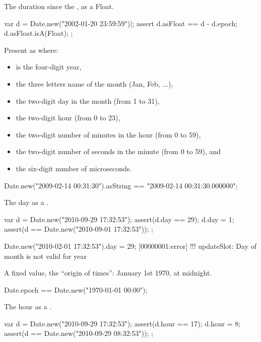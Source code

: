 \begin{urbiscriptapi}
\item[asFloat] The duration since the , as a Float.
\begin{urbiscript}
var d = Date.new("2002-01-20 23:59:59")|;
assert
{
  d.asFloat == d - d.epoch;
  d.asFloat.isA(Float);
};
\end{urbiscript}

\item[asString] Present as  where:
  \begin{itemize}
  \item {} is the four-digit year,
  \item {} the three letters name of the month (Jan, Feb, ...),
  \item {} the two-digit day in the month (from 1 to 31),
  \item {} the two-digit hour (from 0 to 23),
  \item {} the two-digit number of minutes in the hour (from 0 to 59),
  \item {} the two-digit number of seconds in the minute (from 0 to
    59), and
  \item {} the six-digit number of microseconds.
  \end{itemize}
\begin{urbiassert}
Date.new("2009-02-14 00:31:30").asString == "2009-02-14 00:31:30.000000";
\end{urbiassert}

\item[day]
  The day as a .
\begin{urbiscript}
{
  var d = Date.new("2010-09-29 17:32:53");
  assert(d.day == 29);
  d.day = 1;
  assert(d == Date.new("2010-09-01 17:32:53"));
};
\end{urbiscript}
\begin{urbiscript}
Date.new("2010-02-01 17:32:53").day = 29;
[00000001:error] !!! updateSlot: Day of month is not valid for year
\end{urbiscript}

\item[epoch]
  A fixed value, the ``origin of times'': January 1st 1970, at
  midnight.
\begin{urbiunchecked}
Date.epoch == Date.new("1970-01-01 00:00");
\end{urbiunchecked}

\item[hour]
  The hour as a .
\begin{urbiscript}
{
  var d = Date.new("2010-09-29 17:32:53");
  assert(d.hour == 17);
  d.hour = 8;
  assert(d == Date.new("2010-09-29 08:32:53"));
};
\end{urbiscript}


\end{urbiscriptapi}
